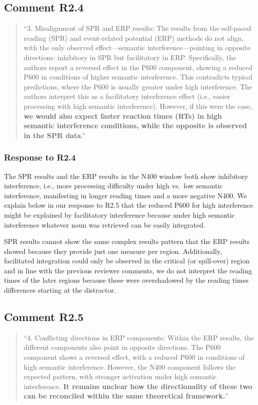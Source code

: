 \documentclass[12pt]{article}
\begin{document}
\subsection*{Comment R2.4}
\begin{quote}
``3. Misalignment of SPR and ERP results: The results from the self-paced reading (SPR) and event-related potential (ERP) methods do not align, with the only observed effect—semantic interference—pointing in opposite directions: inhibitory in SPR but facilitatory in ERP. Specifically, the authors report a reversed effect in the P600 component, showing a reduced P600 in conditions of higher semantic interference. This contradicts typical predictions, where the P600 is usually greater under high interference. The authors interpret this as a facilitatory interference effect (i.e., easier processing with high semantic interference). However, if this were the case, \textbf{we would also expect faster reaction times (RTs) in high semantic interference conditions, while the opposite is observed in the SPR data}.''
\end{quote}

\subsubsection*{Response to R2.4}
The SPR results and the ERP results in the N400 window both show inhibitory interference, i.e., more processing difficulty under high vs.\ low semantic interference, manifesting in longer reading times and a more negative N400. We explain below in our response to R2.5 that the reduced P600 for high interference might be explained by facilitatory interference because under high semantic interference whatever noun was retrieved can be easily integrated. 

SPR results cannot show the same complex results pattern that the ERP results showed because they provide just one measure per region. Additionally, facilitated integration could only be observed in the critical (or spill-over) region and in line with the previous reviewer comments, we do not interpret the reading times of the later regions because these were overshadowed by the reading times differences starting at the distractor.

 
\subsection*{Comment R2.5}
\begin{quote}
``4. Conflicting directions in ERP components: Within the ERP results, the different components also point in opposite directions. The P600 component shows a reversed effect, with a reduced P600 in conditions of high semantic interference. However, the N400 component follows the expected pattern, with stronger activation under high semantic interference. \textbf{It remains unclear how the directionality of these two can be reconciled within the same theoretical framework.}''
\end{quote}
\end{document}
